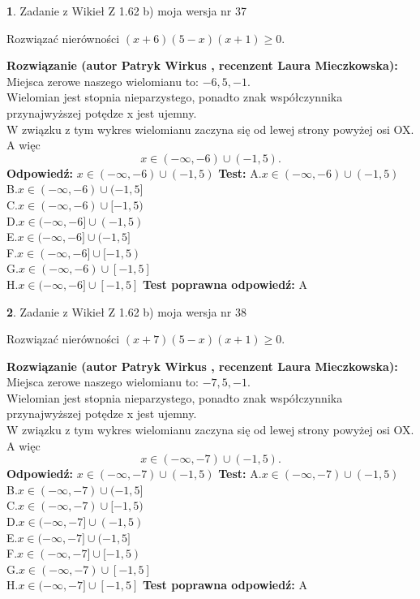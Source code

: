 \documentclass[12pt, a4paper]{article}
\theoremstyle{definition} %
\newtheorem{zad}{}
\newcommand{\zadStart}[1]{\begin{zad}#1\newline}
\newcommand{\zadStop}{\end{zad}}
\newcommand{\rozwStart}[2]{\noindent \textbf{Rozwiązanie (autor #1 , recenzent #2): }\newline}
\newcommand{\rozwStop}{\newline}
\newcommand{\odpStart}{\noindent \textbf{Odpowiedź:}\newline}
\newcommand{\odpStop}{\newline}
\newcommand{\testStart}{\noindent \textbf{Test:}\newline}
\newcommand{\testStop}{\newline}
\newcommand{\kluczStart}{\noindent \textbf{Test poprawna odpowiedź:}\newline}
\newcommand{\kluczStop}{\newline}
\begin{document}
\zadStart{Zadanie z Wikieł Z 1.62 b) moja wersja nr 37}

Rozwiązać nierówności $(x+6)(5-x)(x+1)\ge0$.
\zadStop
\rozwStart{Patryk Wirkus}{Laura Mieczkowska}
Miejsca zerowe naszego wielomianu to: $-6, 5, -1$.\\
Wielomian jest stopnia nieparzystego, ponadto znak współczynnika przy\linebreak najwyższej potędze x jest ujemny.\\ W związku z tym wykres wielomianu zaczyna się od lewej strony powyżej osi OX. A więc $$x \in (-\infty,-6) \cup (-1,5).$$
\rozwStop
\odpStart
$x \in (-\infty,-6) \cup (-1,5)$
\odpStop
\testStart
A.$x \in (-\infty,-6) \cup (-1,5)$\\
B.$x \in (-\infty,-6) \cup (-1,5]$\\
C.$x \in (-\infty,-6) \cup [-1,5)$\\
D.$x \in (-\infty,-6] \cup (-1,5)$\\
E.$x \in (-\infty,-6] \cup (-1,5]$\\
F.$x \in (-\infty,-6] \cup [-1,5)$\\
G.$x \in (-\infty,-6) \cup [-1,5]$\\
H.$x \in (-\infty,-6] \cup [-1,5]$
\testStop
\kluczStart
A
\kluczStop



\zadStart{Zadanie z Wikieł Z 1.62 b) moja wersja nr 38}

Rozwiązać nierówności $(x+7)(5-x)(x+1)\ge0$.
\zadStop
\rozwStart{Patryk Wirkus}{Laura Mieczkowska}
Miejsca zerowe naszego wielomianu to: $-7, 5, -1$.\\
Wielomian jest stopnia nieparzystego, ponadto znak współczynnika przy\linebreak najwyższej potędze x jest ujemny.\\ W związku z tym wykres wielomianu zaczyna się od lewej strony powyżej osi OX. A więc $$x \in (-\infty,-7) \cup (-1,5).$$
\rozwStop
\odpStart
$x \in (-\infty,-7) \cup (-1,5)$
\odpStop
\testStart
A.$x \in (-\infty,-7) \cup (-1,5)$\\
B.$x \in (-\infty,-7) \cup (-1,5]$\\
C.$x \in (-\infty,-7) \cup [-1,5)$\\
D.$x \in (-\infty,-7] \cup (-1,5)$\\
E.$x \in (-\infty,-7] \cup (-1,5]$\\
F.$x \in (-\infty,-7] \cup [-1,5)$\\
G.$x \in (-\infty,-7) \cup [-1,5]$\\
H.$x \in (-\infty,-7] \cup [-1,5]$
\testStop
\kluczStart
A
\kluczStop
\end{document}

